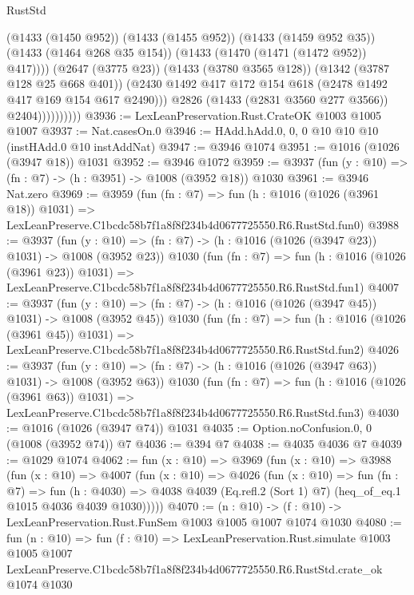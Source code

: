 \begin{lexlean}{RustStd}
\begin{coremodule}
                              (@1433 (@1450 @952))
                              (@1433 (@1455 @952))
                              (@1433 (@1459 @952 @35))
                              (@1433 (@1464 @268 @35 @154))
                              (@1433 (@1470 (@1471 (@1472 @952)) @417))))
                          (@2647 (@3775 @23))
                          (@1433 (@3780 @3565 @128))
                          (@1342 (@3787 @128 @25 @668 @401))
                          (@2430 @1492 @417 @172 @154 @618 (@2478 @1492 @417 @169 @154 @617 @2490)))
                        @2826
                        (@1433 (@2831 @3560 @277 @3566))
                        @2404))))))))))
@3936 := LexLeanPreservation.Rust.CrateOK @1003 @1005 @1007
@3937 := Nat.casesOn.{0}
@3946 := HAdd.hAdd.{0, 0, 0} @10 @10 @10 (instHAdd.{0} @10 instAddNat)
@3947 := @3946 @1074
@3951 := @1016 (@1026 (@3947 @18)) @1031
@3952 := @3946 @1072
@3959 := @3937 (fun (y : @10) => (fn : @7) -> (h : @3951) -> @1008 (@3952 @18)) @1030
@3961 := @3946 Nat.zero
@3969 := @3959
    (fun (fn : @7) =>
    fun (h : @1016 (@1026 (@3961 @18)) @1031) =>
    LexLeanPreserve.C1bcdc58b7f1a8f8f234b4d0677725550.R6.RustStd.fun0)
@3988 := @3937
    (fun (y : @10) => (fn : @7) -> (h : @1016 (@1026 (@3947 @23)) @1031) -> @1008 (@3952 @23))
    @1030
    (fun (fn : @7) =>
    fun (h : @1016 (@1026 (@3961 @23)) @1031) =>
    LexLeanPreserve.C1bcdc58b7f1a8f8f234b4d0677725550.R6.RustStd.fun1)
@4007 := @3937
    (fun (y : @10) => (fn : @7) -> (h : @1016 (@1026 (@3947 @45)) @1031) -> @1008 (@3952 @45))
    @1030
    (fun (fn : @7) =>
    fun (h : @1016 (@1026 (@3961 @45)) @1031) =>
    LexLeanPreserve.C1bcdc58b7f1a8f8f234b4d0677725550.R6.RustStd.fun2)
@4026 := @3937
    (fun (y : @10) => (fn : @7) -> (h : @1016 (@1026 (@3947 @63)) @1031) -> @1008 (@3952 @63))
    @1030
    (fun (fn : @7) =>
    fun (h : @1016 (@1026 (@3961 @63)) @1031) =>
    LexLeanPreserve.C1bcdc58b7f1a8f8f234b4d0677725550.R6.RustStd.fun3)
@4030 := @1016 (@1026 (@3947 @74)) @1031
@4035 := Option.noConfusion.{0, 0} (@1008 (@3952 @74)) @7
@4036 := @394 @7
@4038 := @4035 @4036 @7
@4039 := @1029 @1074
@4062 := fun (x : @10) =>
  @3969
    (fun (x : @10) =>
    @3988
      (fun (x : @10) =>
      @4007
        (fun (x : @10) =>
        @4026
          (fun (x : @10) =>
          fun (fn : @7) =>
          fun (h : @4030) =>
          @4038 @4039 (Eq.refl.{2} (Sort 1) @7) (heq_of_eq.{1} @1015 @4036 @4039 @1030)))))
@4070 := (n : @10) -> (f : @10) -> LexLeanPreservation.Rust.FunSem @1003 @1005 @1007 @1074 @1030
@4080 := fun (n : @10) =>
  fun (f : @10) =>
  LexLeanPreservation.Rust.simulate
    @1003
    @1005
    @1007
    LexLeanPreserve.C1bcdc58b7f1a8f8f234b4d0677725550.R6.RustStd.crate_ok
    @1074
    @1030
\end{coremodule}
\end{lexlean}
